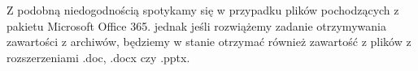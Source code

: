 Z podobną niedogodnością spotykamy się w przypadku plików pochodzących z pakietu Microsoft
Office 365. jednak jeśli rozwiążemy zadanie otrzymywania zawartości z archiwów, będziemy w stanie otrzymać również 
zawartość z plików z rozszerzeniami .doc, .docx czy .pptx.
